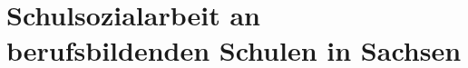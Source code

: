 \section{Schulsozialarbeit an berufsbildenden Schulen in Sachsen}
\label{sec:k3_Schulsozialarbeit an berufsbildenden Schulen in Sachsen}

